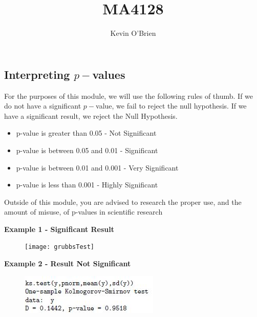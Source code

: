 \documentclass[12pt, a4paper]{article}
\begin{document}
	\author{Kevin O'Brien}
	\title{MA4128}
	
\subsection*{Interpreting $p-$values}

For the purposes of this module, we will use the following rules of thumb.
If we do not have a significant $p-$value, we fail to reject the null hypothesis.
If we have a significant result, we reject the Null Hypothesis.
\begin{itemize}
	\item p-value is greater than 0.05 - Not Significant
	\item p-value is between 0.05 and 0.01 - Significant
	\item p-value is between 0.01 and 0.001 - Very Significant
	\item p-value is less than 0.001 - Highly Significant
\end{itemize}
Outside of this module, you are advised to research the proper use, and the amount of misuse, of p-values in scientific research

\bigskip

\noindent \textbf{Example 1  - Significant Result}
\begin{figure}[h!]
\centering
\texttt{[image: grubbsTest]}
\caption{}
\label{fig:gruubsTest}
\end{figure}

\bigskip
\noindent \textbf{Example 2 - Result Not Significant}
\begin{figure}[h!]
\centering
\includegraphics[width=0.55\linewidth]{kstest}
\caption{}
\label{fig:kstest}
\end{figure}
\end{document}
